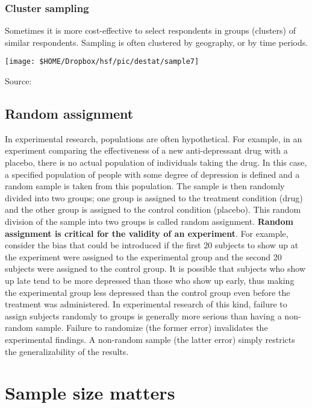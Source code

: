 \subsubsection{Cluster sampling}
Sometimes it is more cost-effective to select respondents in groups (clusters) of similar respondents. Sampling is often clustered by geography, or by time periods.
\begin{center}\texttt{[image: \$HOME/Dropbox/hsf/pic/destat/sample7]}
	
	Source: \citet[p. 92]{Gonick1993Cartoon}\end{center}


\subsection{Random assignment}

In experimental research, populations are often hypothetical. For example, in an
experiment comparing the effectiveness of a new anti-depressant drug with a
placebo, there is no actual population of individuals taking the drug. In this case, a
specified population of people with some degree of depression is defined and a
random sample is taken from this population. The sample is then randomly divided
into two groups; one group is assigned to the treatment condition (drug) and the
other group is assigned to the control condition (placebo). This random division of
the sample into two groups is called random assignment. \textbf{Random assignment is
critical for the validity of an experiment}. For example, consider the bias that could
be introduced if the first 20 subjects to show up at the experiment were assigned to
the experimental group and the second 20 subjects were assigned to the control
group. It is possible that subjects who show up late tend to be more depressed than
those who show up early, thus making the experimental group less depressed than
the control group even before the treatment was administered.
In experimental research of this kind, failure to assign subjects randomly to
groups is generally more serious than having a non-random sample. Failure to
randomize (the former error) invalidates the experimental findings. A non-random
sample (the latter error) simply restricts the generalizability of the results.



\section{Sample size matters}

